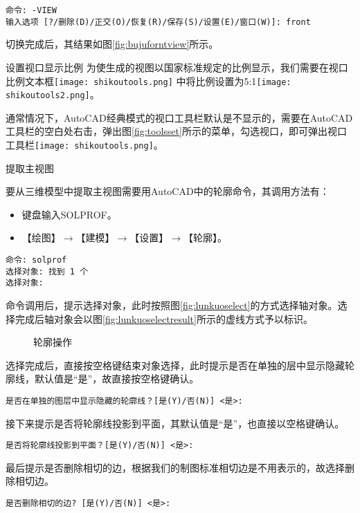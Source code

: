 \begin{procedure}
\begin{lstlisting}
命令: -VIEW
输入选项 [?/删除(D)/正交(O)/恢复(R)/保存(S)/设置(E)/窗口(W)]: front
\end{lstlisting}

切换完成后，其结果如图\ref{fig:bujuforntview}所示。
\item 设置视口显示比例
为使生成的视图以国家标准规定的比例显示，我们需要在视口比例文本框\texttt{[image: shikoutools.png]}  中将比例设置为5:1\texttt{[image: shikoutools2.png]}。

通常情况下，AutoCAD经典模式的视口工具栏默认是不显示的，需要在AutoCAD工具栏的空白处右击，弹出图\ref{fig:toolsset}所示的菜单，勾选视口，即可弹出视口工具栏\texttt{[image: shikoutools.png]}。
\item 提取主视图

要从三维模型中提取主视图需要用AutoCAD中的轮廓命令，其调用方法有：
\begin{itemize}
\item 键盘输入SOLPROF。
\item 【绘图】$\rightarrow$【建模】$\rightarrow$【设置】$\rightarrow$【轮廓】。
\end{itemize}
\begin{lstlisting}
命令: solprof
选择对象: 找到 1 个
选择对象:
\end{lstlisting}
命令调用后，提示选择对象，此时按照图\ref{fig:lunkuoselect}的方式选择轴对象。选择完成后轴对象会以图\ref{fig:lunkuoselectresult}所示的虚线方式予以标识。
\begin{figure}[htbp]
\centering
{}
\hspace{20pt}
\caption{轮廓操作}
\end{figure}

选择完成后，直接按空格键结束对象选择，此时提示是否在单独的层中显示隐藏轮廓线，默认值是“是”，故直接按空格键确认。
\begin{lstlisting}
是否在单独的图层中显示隐藏的轮廓线？[是(Y)/否(N)] <是>:
\end{lstlisting}
接下来提示是否将轮廓线投影到平面，其默认值是“是”，也直接以空格键确认。
\begin{lstlisting}
是否将轮廓线投影到平面？[是(Y)/否(N)] <是>:
\end{lstlisting}
最后提示是否删除相切的边，根据我们的制图标准相切边是不用表示的，故选择删除相切边。
\begin{lstlisting}
是否删除相切的边? [是(Y)/否(N)] <是>:
\end{lstlisting}


\end{procedure}
